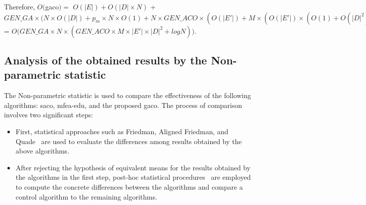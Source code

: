 Therefore, $O($\acrshort{gaco}$) = $
$O(|E|) + O(|D|\times N)$ + $GEN\_GA\times\bigg(N \times O(|D|) + p_{m}\times N\times O(1) + N\times GEN\_ACO\times (O(|E'|) + M\times (O(|E'|)\times (O(1)+O(|D|^2)))) + N\times O(logN))\bigg)$
= $O\bigg(GEN\_GA\times N\times (GEN\_ACO\times M\times|E'|\times|D|^2 +logN)\bigg)$.

\subsection{Analysis of the obtained results by the Non-parametric statistic}
The Non-parametric statistic is used to compare the effectiveness of the following algorithms: \acrshort{saco}, \acrshort{mfea-edu}, and the proposed \acrshort{gaco}. The process of comparison involves two significant steps:
\begin{itemize}
	\item First, statistical approaches such as Friedman, Aligned Friedman, and Quade~\cite{carrasco_recent_2020, derrac_practical_2011} are used to evaluate the differences among results obtained by the above algorithms.
	\item After rejecting the hypothesis of equivalent means for the results obtained by the algorithms in the first step, post-hoc statistical procedures~\cite{carrasco_recent_2020} are employed to compute the concrete differences between the algorithms and compare a control algorithm to the remaining algorithms.
\end{itemize}

